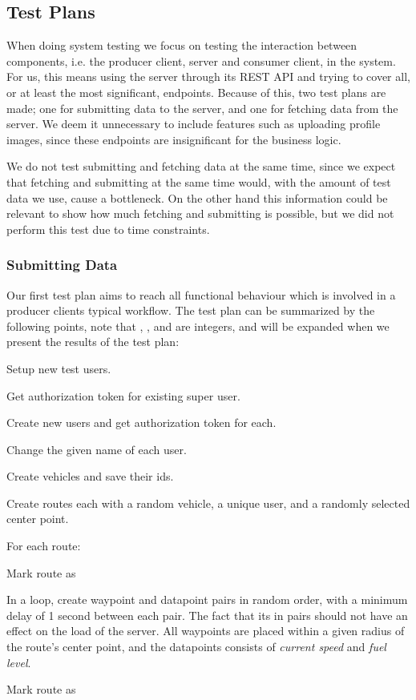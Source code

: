 \subsection{Test Plans}
When doing system testing we focus on testing the interaction between components, i.e. the producer client, server and consumer client, in the system.
For us, this means using the server through its REST API and trying to cover all, or at least the most significant, endpoints.
Because of this, two test plans are made; one for submitting data to the server, and one for fetching data from the server.
We deem it unnecessary to include features such as uploading profile images, since these endpoints are insignificant for the business logic.

We do not test submitting and fetching data at the same time, since we expect that fetching and submitting at the same time would, 
with the amount of test data we use, cause a bottleneck.
On the other hand this information could be relevant to show how much fetching and submitting is possible, but we did not perform this test due to time constraints.

\subsubsection*{Submitting Data}
Our first test plan aims to reach all functional behaviour which is involved in a producer clients typical workflow.
The test plan can be summarized by the following points, note that , , and  are integers, and will be expanded when we present the results of the test plan:
\begin{enumberate}
    \item Setup  new test users.
    \begin{enumberate}
        \item Get authorization token for existing super user.
        \item Create  new users and get authorization token for each.
        \item Change the given name of each user.
    \end{enumberate}
    \item Create  vehicles and save their ids.
    \item Create  routes each with a random vehicle, a unique user, and a randomly selected center point.
    \item For each route:
    \begin{enumberate}
        \item Mark route as 
        \item In a loop, create  waypoint and datapoint pairs in random order, with a minimum delay of 1 second between each pair.
              The fact that its in pairs should not have an effect on the load of the server.
              All waypoints are placed within a given radius of the route's center point, and the datapoints consists of \textit{current speed} and \textit{fuel level}.
        \item Mark route as 
    \end{enumberate}
\end{enumberate}

